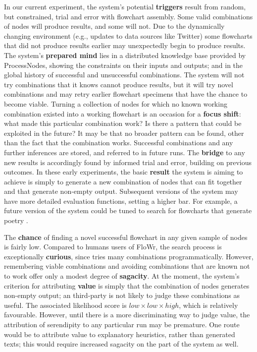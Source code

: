 In our current experiment, the system's potential \textbf{triggers}
result from random, but constrained, trial and error with flowchart assembly.  Some valid
combinations of nodes will produce results, and some will not.  Due to
the dynamically changing environment (e.g., updates to data sources
like Twitter) some flowcharts that did not produce results earlier may
unexpectedly begin to produce results.
%
The system's \textbf{prepared mind} lies in a distributed knowledge
base provided by ProcessNodes, showing the constraints on their inputs
and outputs; and in the global history of successful and unsuccessful combinations.
%
The system will not try combinations that it knows cannot produce
results, but it will try novel combinations and may retry earlier
flowchart specimens that have the chance to become viable.  Turning a
collection of nodes for which no known working combination existed
into a working flowchart is an occasion for a \textbf{focus shift}:
what made this particular combination work?  Is there a pattern that
could be exploited in the future?  It may be that no
broader pattern can be found, other than the fact that the combination works.
%
Successful combinations and any further inferences are stored, and
referred to in future runs.  The \textbf{bridge} to any new
results is accordingly found by informed trial and error, building
on previous outcomes.
%
In these early experiments, the basic \textbf{result} the system is
aiming to achieve is simply to generate a new combination of nodes that can fit together and that generate non-empty output.  Subsequent versions of the system may have more detailed evaluation functions, setting a higher bar.  For example, a future version of the system could be tuned to search for flowcharts that generate poetry \cite{corneli2015computational}.

The \textbf{chance} of finding a novel successful flowchart in any given sample of nodes is fairly low.  Compared to
humans users of {\sf FloWr}, the search process is exceptionally \textbf{curious}, since tries many combinations programmatically.  However, remembering viable combinations and avoiding combinations that are known not to work offer only a modest degree of \textbf{sagacity}.  At the moment,
the system's criterion for attributing \textbf{value} is simply that
the combination of nodes generates non-empty output; an
third-party is not likely to judge these combinations as
useful.  The associated likelihood score is
$\mathit{low}\times\mathit{low}\times\mathit{high}$, which
is relatively favourable.  However, until there is a
more discriminating way to judge value, the attribution of serendipity to any particular run may be premature.  One route
would be to attribute value to explanatory heuristics, rather
than generated texts; this would require increased sagacity on
the part of the system as well.


